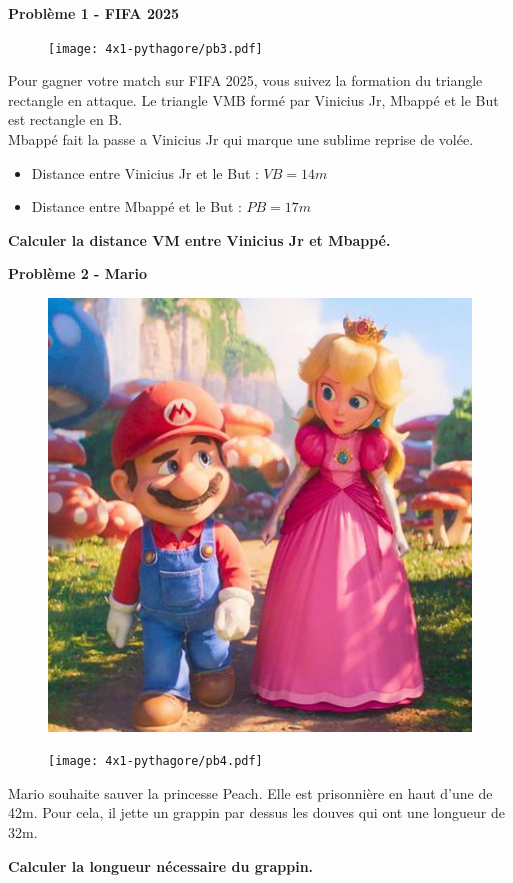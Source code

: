 \textbf{Problème 1 - FIFA 2025} \\

\begin{figure}[H]
  \centering
  \texttt{[image: 4x1-pythagore/pb3.pdf]}
\end{figure}
  
Pour gagner votre match sur FIFA 2025, vous suivez la formation du triangle rectangle en attaque. Le triangle VMB formé par Vinicius Jr, Mbappé et le But est rectangle en B. \\
  
Mbappé fait la passe a Vinicius Jr qui marque une sublime reprise de volée. 
  
\begin{itemize}
  \item Distance entre Vinicius Jr et le But : $VB = 14m$
  \item Distance entre Mbappé et le But : $PB = 17m$
\end{itemize}
  
\textbf{Calculer la distance VM entre Vinicius Jr et Mbappé.} 

\newpage

\begin{multicols}{2} 
  \textbf{Problème 2 - Mario} \\
  
  \begin{figure}[H]
    \centering
    \includegraphics[width=0.3\linewidth]{4x1-pythagore/pb4-mario.png}
  \end{figure}

  \begin{figure}[H]
    \centering
    \texttt{[image: 4x1-pythagore/pb4.pdf]}
  \end{figure}
\end{multicols}

Mario souhaite sauver la princesse Peach. Elle est prisonnière en haut d'une de 42m. Pour cela, il jette un grappin par dessus les douves qui ont une longueur de 32m.
  
\textbf{Calculer la longueur nécessaire du grappin.} \\


